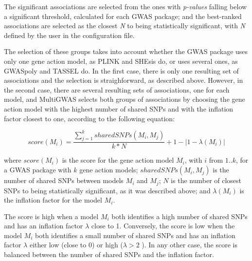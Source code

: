 \documentclass{article}
\begin{document}
The significant associations are selected from the ones with \emph{p-values} falling below a significant threshold, calculated for each GWAS package; and the best-ranked associations are selected as the closest \emph{N} to being statistically significant, with \emph{N} defined by the user in the configuration file.

The selection of these groups takes into account whether the GWAS package uses only one gene action model, as PLINK and SHEsis do, or uses several ones, as GWASpoly and TASSEL do. In the first case, there is only one resulting set of associations and the selection is straighforward, as described above. However, in the second case, there are several resulting sets of associations, one for each model, and MultiGWAS selects both groups of associations by choosing the gene action model with the highest number of shared SNPs and with the inflation factor closest to one, according to the following equation:

\[
score(M_{i})=\frac{\sum\limits _{j=1}^{k}{\textstyle sharedSNPs(M_{i},M_{j})}}{k*N}+1-|1-\lambda(M_{i})|
\]

where $score(M_{i})$ is the score for the gene action model $M_{i}$, with $i$ from $1..k$, for a GWAS package with $k$ gene action models; $sharedSNPs(M_{i},M_{j})$ is the number of shared SNPs between models $M_{i}$ and $M_{j}$; $N$ is the number of closest SNPs to being statistically significant, as it was described above; and $\lambda(M_{i})$ is the inflation factor for the model $M_{i}$.

The score is high when a model $M_{i}$ both identifies a high number of shared SNPs and has an inflation factor $\lambda$ close to 1. Conversely, the score is low when the model $M_{i}$ both identifies a small number of shared SNPs and has an inflation factor $\lambda$ either low (close to 0) or high ($\lambda>2$ ). In any other case, the score is balanced between the number of shared SNPs and the inflation factor.\color{black}
\end{document}

